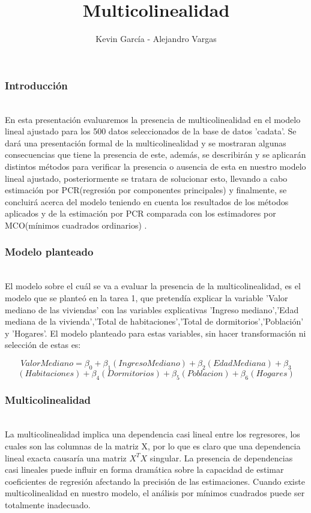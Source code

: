 \documentclass[12pt]{beamer}
\author{Kevin García - Alejandro Vargas}
\title{Multicolinealidad}
\begin{document}
\justify
\begin{frame}
\titlepage
\end{frame}

\begin{frame}
\frametitle{Introducción}
~\\ En esta presentación evaluaremos la presencia de multicolinealidad en el modelo lineal ajustado para los 500 datos seleccionados de la base de datos 'cadata'. Se dará una presentación formal de la multicolinealidad y se mostraran algunas consecuencias que tiene la presencia de este, además, se describirán y se aplicarán distintos métodos para verificar la presencia o ausencia de esta en nuestro modelo lineal ajustado, posteriormente se tratara de solucionar esto, llevando a cabo estimación por PCR(regresión por componentes principales) y finalmente, se concluirá acerca del modelo teniendo en cuenta los resultados de los métodos aplicados y de la estimación por PCR comparada con los estimadores por MCO(mínimos cuadrados ordinarios) .
\end{frame}

\begin{frame}
\frametitle{Modelo planteado}
~\\ El modelo sobre el cuál se va a evaluar la presencia de la multicolinealidad, es el modelo que se planteó en la tarea 1, que pretendía explicar la variable 'Valor mediano de las viviendas' con las variables explicativas 'Ingreso mediano','Edad mediana de la vivienda','Total de habitaciones','Total de dormitorios','Población' y 'Hogares'. El modelo planteado para estas variables, sin hacer transformación ni selección de estas es:

$$ValorMediano =\beta_{0}+\beta_{1}(IngresoMediano)+\beta_{2}(EdadMediana)+\beta_{3}$$
$$(Habitaciones)+\beta_{4}(Dormitorios)+\beta_{5}(Poblacion)+\beta_{6}(Hogares)$$ 
\end{frame}

\begin{frame}
\frametitle{Multicolinealidad}
~\\La multicolinealidad implica una dependencia casi lineal entre los regresores, los cuales son las columnas de la matriz X, por lo que es claro que una dependencia lineal exacta causaría una matriz $X^{T}X$ singular. La presencia de dependencias casi lineales puede influir en forma dramática sobre la capacidad de estimar coeficientes de regresión afectando la precisión de las estimaciones. Cuando existe multicolinealidad en nuestro modelo, el análisis por mínimos cuadrados puede ser totalmente inadecuado.
\end{frame}
\end{document}

